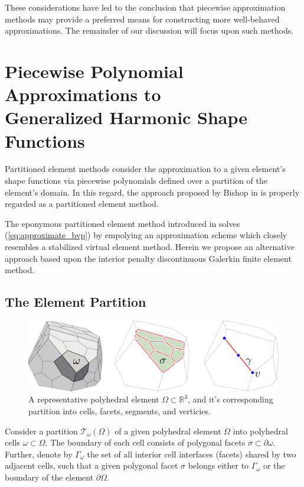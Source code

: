 	These considerations have led to the conclusion that piecewise approximation methods may provide a preferred means for constructing more well-behaved approximations. The remainder of our discussion will focus upon such methods.
	
\section{Piecewise Polynomial Approximations to \\ Generalized Harmonic Shape Functions}

Partitioned element methods consider the approximation to a given element's shape functions via piecewise polynomials defined over a partition of the element's domain. In this regard, the approach proposed by Bishop in \cite{Bishop:14} is properly regarded as a partitioned element method.

The eponymous partitioned element method introduced in \cite{Rashid:12} solves (\ref{eq:approximate_bvp}) by empolying an approximation scheme which closely resembles a stabilized virtual element method. Herein we propose an alternative approach based upon the interior penalty discontinuous Galerkin finite element method.

\subsection*{The Element Partition}

\begin{figure} [!ht]
	\centering
	\includegraphics[width = 6.0in]{figures/polyhedron_partition.pdf}
	\caption{A representative polyhedral element $\Omega \subset \mathbb{R}^3$, and it's corresponding partition into cells, facets, segments, and verticies.}
	\label{fig:partitioned_element}
\end{figure}

	Consider a partition $\mathcal{T}_\omega (\Omega)$ of a given polyhedral element $\Omega$ into polyhedral cells $\omega \subset \Omega$. The boundary of each cell consists of polygonal facets $\sigma \subset \partial \omega$. Further, denote by $\Gamma_\omega$ the set of all interior cell interfaces (facets) shared by two adjacent cells, such that a given polygonal facet $\sigma$ belongs either to $\Gamma_\omega$ or the boundary of the element $\partial \Omega$.
	
